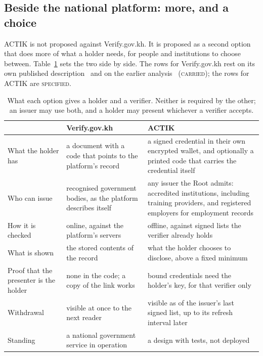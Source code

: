 \documentclass[10pt,a4paper,twocolumn]{article}
\newcommand{\kind}[1]{\textsc{#1}}
\newenvironment{widetable}{\begin{table}[t]}{\end{table}}
\newenvironment{widetable}{\begin{table}[t]}{\end{table}}
\begin{document}
\subsection{Beside the national platform: more, and a choice}
\label{sec:choice}

ACTIK is not proposed against Verify.gov.kh. It is proposed as a second option
that does more of what a holder needs, for people and institutions to choose
between. Table~\ref{tab:choice} sets the two side by side. The rows for
Verify.gov.kh rest on its own published description~\citep{verifygovkh} and on
the earlier analysis~\citep{chay2026qrseal} (\kind{carried}); the rows for ACTIK
are \kind{specified}.

\begin{widetable}
\centering\small
\caption{What each option gives a holder and a verifier. Neither is required by the
other; an issuer may use both, and a holder may present whichever a verifier
accepts.}
\label{tab:choice}
\begin{tabularx}{\linewidth}{@{}lXX@{}}
\toprule
& Verify.gov.kh & ACTIK \\
\midrule
What the holder has & a document with a code that points to the platform's record & a signed credential in their own encrypted wallet, and optionally a printed code that carries the credential itself \\
Who can issue & recognised government bodies, as the platform describes itself & any issuer the Root admits: accredited institutions, including training providers, and registered employers for employment records \\
How it is checked & online, against the platform's servers & offline, against signed lists the verifier already holds \\
What is shown & the stored contents of the record & what the holder chooses to disclose, above a fixed minimum \\
Proof that the presenter is the holder & none in the code; a copy of the link works & bound credentials need the holder's key, for that verifier only \\
Withdrawal & visible at once to the next reader & visible as of the issuer's last signed list, up to its refresh interval later \\
Standing & a national government service in operation & a design with tests, not deployed \\
\bottomrule
\end{tabularx}
\end{widetable}
\end{document}
